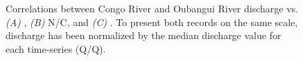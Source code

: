 \begin{figure}[p]
	\caption[Discharge vs. , N/C, and ]{Correlations between Congo River and Oubangui River discharge vs. \textit{(A)} , \textit{(B)} N/C, and \textit{(C)} . To present both records on the same scale, discharge has been normalized by the median discharge value for each time-series (Q/Q).}
	\label{Ch5Fig:6} 
\end{figure}

